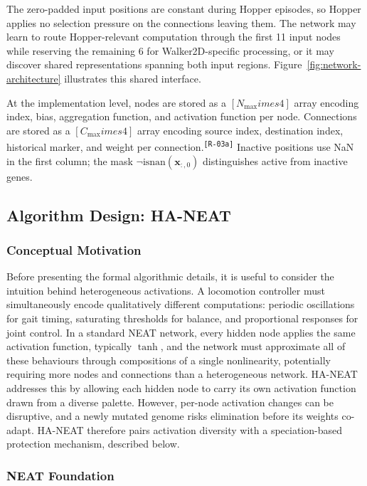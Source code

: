 \documentclass[12pt]{article}
\newcommand{\cohID}[1]{\textsuperscript{\scriptsize\texttt{[#1]}}}
\newcommand{\cohRepeat}[2]{\textcolor{cohRepeat}{#2}\cohID{#1}}
\begin{document}
The zero-padded input positions are constant during Hopper episodes, so Hopper applies no selection pressure on the connections leaving them.
The network may learn to route Hopper-relevant computation through the first 11 input nodes while reserving the remaining 6 for Walker2D-specific processing, or it may discover shared representations spanning both input regions.
Figure~\ref{fig:network-architecture} illustrates this shared interface.

\cohRepeat{R-03a}{At the implementation level, nodes are stored as a $[N_{\max} 	imes 4]$ array encoding index, bias, aggregation function, and activation function per node.
Connections are stored as a $[C_{\max} 	imes 4]$ array encoding source index, destination index, historical marker, and weight per connection.}
Inactive positions use NaN in the first column; the mask $\neg\text{isnan}(\mathbf{x}_{:,0})$ distinguishes active from inactive genes.


\subsection{Algorithm Design: HA-NEAT}
\label{subsec:algorithm-design-ha-neat}

\subsubsection{Conceptual Motivation}
\label{subsubsec:conceptual-motivation}

Before presenting the formal algorithmic details, it is useful to consider the intuition behind heterogeneous activations.
A locomotion controller must simultaneously encode qualitatively different computations: periodic oscillations for gait timing, saturating thresholds for balance, and proportional responses for joint control.
In a standard NEAT network, every hidden node applies the same activation function, typically $\tanh$, and the network must approximate all of these behaviours through compositions of a single nonlinearity, potentially requiring more nodes and connections than a heterogeneous network.
HA-NEAT addresses this by allowing each hidden node to carry its own activation function drawn from a diverse palette.
However, per-node activation changes can be disruptive, and a newly mutated genome risks elimination before its weights co-adapt.
HA-NEAT therefore pairs activation diversity with a speciation-based protection mechanism, described below.

\subsubsection{NEAT Foundation}
\label{subsubsec:neat-foundation}
\end{document}
